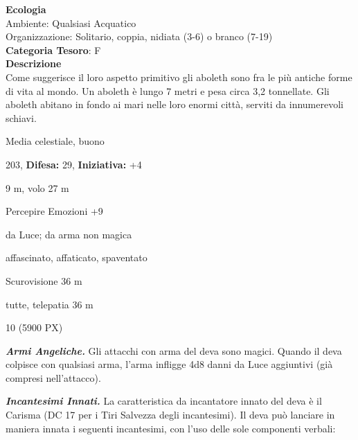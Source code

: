 \begin{multicols}{2}
{\textbf{Ecologia}\\
Ambiente: Qualsiasi Acquatico\\
Organizzazione: Solitario, coppia, nidiata (3-6) o branco (7-19)\\
\textbf{Categoria Tesoro}: F\\
\textbf{Descrizione}\\
Come suggerisce il loro aspetto primitivo gli aboleth sono fra le più antiche forme di vita al mondo. Un aboleth è lungo 7 metri e pesa circa 3,2 tonnellate. Gli aboleth abitano in fondo ai mari nelle loro enormi città, serviti da innumerevoli schiavi.

\begin{description}[noitemsep, topsep=0pt, parsep=0pt, partopsep=0pt, leftmargin=0cm, labelwidth=2.2cm]
	\item[\textbf{Taglia/Tipo:}] Media celestiale, buono
	\item[\textbf{Caratt.:}] 
	\item[\textbf{Punti Ferita:}] 203,  \textbf{Difesa:} 29,  \textbf{Iniziativa:} +4
	\item[\textbf{Movimento:}] 9 m, volo 27 m
	\item[\textbf{Tiri Salvez.:}] 
	\item[\textbf{Comp.:}] Percepire Emozioni +9
	\item[\textbf{Res. Danni:}] da Luce; da arma non magica
	\item[\textbf{Immunità:}] affascinato, affaticato, spaventato
	\item[\textbf{Sensi:}] Scurovisione 36 m
	\item[\textbf{Linguaggi:}] tutte, telepatia 36 m
	\item[\textbf{Sfida:}] 10 (5900 PX)\smallskip
\end{description}

\emph{\textbf{Armi Angeliche.}} Gli attacchi con arma del deva sono magici. Quando il deva colpisce con qualsiasi arma, l'arma infligge 4d8 danni da Luce aggiuntivi (già compresi nell'attacco).

\emph{\textbf{Incantesimi Innati.}} La caratteristica da incantatore innato del deva è il Carisma (DC 17 per i Tiri Salvezza degli incantesimi). Il deva può lanciare in maniera innata i seguenti incantesimi, con l'uso delle sole componenti verbali:

}
\end{multicols}
